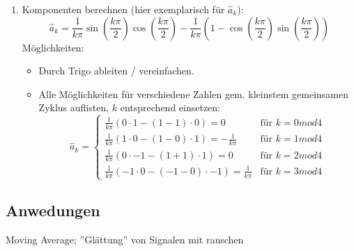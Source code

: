 \begin{enumerate}
\item Komponenten berechnen (hier exemplarisch für $\hat{a}_k$): 
	\[
	\hat{a}_k = \frac{1}{k\pi} \sin\left(\frac{k\pi}{2}\right) \cos\left(\frac{k\pi}{2}\right) - \frac{1}{k\pi}\left(1- \cos\left(\frac{k\pi}{2}\right) \sin\left(\frac{k\pi}{2}\right)\right)
		\]
		Möglichkeiten: \begin{itemize}
			\item Durch Trigo ableiten / vereinfachen.
			\item Alle Möglichkeiten für verschiedene Zahlen gem. kleinstem gemeinsamen Zyklus auflisten, $k$ entsprechend einsetzen: \[
			\hat{a}_k = \begin{cases}
				\frac{1}{k\pi} (0 \cdot 1 - (1 - 1) \cdot 0) = 0 & \text{für } k=0 mod 4 \\
				\frac{1}{k\pi} (1 \cdot 0 - (1 - 0) \cdot 1) = -\frac{1}{k\pi} & \text{für } k=1 mod 4 \\
				\frac{1}{k\pi} (0 \cdot -1 - (1 + 1) \cdot 1) = 0 & \text{für } k=2 mod 4 \\
				\frac{1}{k\pi} (-1 \cdot 0 - (-1 -0) \cdot -1) = \frac{1}{k\pi} & \text{für } k=3 mod 4
			\end{cases}
			\]
		\end{itemize}
\end{enumerate}

\subsection{Anwedungen}

Moving Average; ''Glättung'' von Signalen mit rauschen


